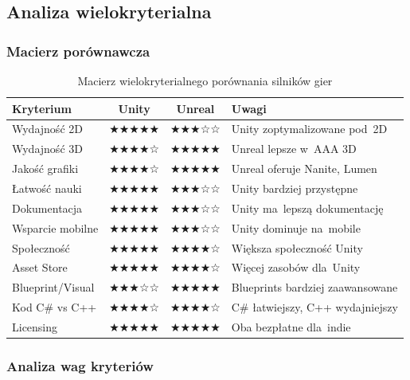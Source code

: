 \subsection{Analiza wielokryterialna}

\subsubsection{Macierz porównawcza}

\begin{table}[h!]
    \centering
    \caption{Macierz wielokryterialnego porównania silników gier}
    \label{tab:comparison-matrix}
    \begin{tabular}{|l|c|c|p{3cm}|}
        \hline
        \textbf{Kryterium} & \textbf{Unity} & \textbf{Unreal} & \textbf{Uwagi} \\
        \hline\hline
        Wydajność 2D & ★★★★★ & ★★★☆☆ & Unity zoptymalizowane pod~2D \\
        \hline
        Wydajność 3D & ★★★★☆ & ★★★★★ & Unreal lepsze w~AAA 3D \\
        \hline
        Jakość grafiki & ★★★★☆ & ★★★★★ & Unreal oferuje Nanite, Lumen \\
        \hline
        Łatwość nauki & ★★★★★ & ★★★☆☆ & Unity bardziej przystępne \\
        \hline
        Dokumentacja & ★★★★★ & ★★★☆☆ & Unity ma~lepszą dokumentację \\
        \hline
        Wsparcie mobilne & ★★★★★ & ★★★☆☆ & Unity dominuje na~mobile \\
        \hline
        Społeczność & ★★★★★ & ★★★★☆ & Większa społeczność Unity \\
        \hline
        Asset Store & ★★★★★ & ★★★★☆ & Więcej zasobów dla~Unity \\
        \hline
        Blueprint/Visual & ★★★☆☆ & ★★★★★ & Blueprints bardziej zaawansowane \\
        \hline
        Kod C\# vs C++ & ★★★★☆ & ★★★★☆ & C\# łatwiejszy, C++ wydajniejszy \\
        \hline
        Licensing & ★★★★★ & ★★★★★ & Oba bezpłatne dla~indie \\
        \hline
    \end{tabular}
\end{table}

\subsubsection{Analiza wag kryteriów}

